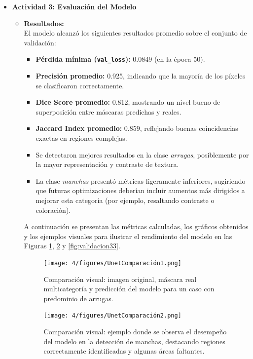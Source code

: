 \begin{enumerate}
\begin{itemize}
  \item\textbf{Actividad 3: Evaluación del Modelo}
  \begin{itemize}
    \item \textbf{Resultados:}\\
El modelo alcanzó los siguientes resultados promedio sobre el conjunto de validación:
\begin{itemize}
  \item \textbf{Pérdida mínima (\texttt{val\_loss}):} 0.0849 (en la época 50).
  \item \textbf{Precisión promedio:} 0.925, indicando que la mayoría de los píxeles se clasificaron correctamente.
  \item \textbf{Dice Score promedio:} 0.812, mostrando un nivel bueno de superposición entre máscaras predichas y reales.
  \item \textbf{Jaccard Index promedio:} 0.859, reflejando buenas coincidencias exactas en regiones complejas.
  \item Se detectaron mejores resultados en la clase \emph{arrugas}, posiblemente por la mayor representación y contraste de textura.
  \item La clase \emph{manchas} presentó métricas ligeramente inferiores, sugiriendo que futuras optimizaciones deberían incluir aumentos más dirigidos a mejorar esta categoría (por ejemplo, resaltando contraste o coloración).
\end{itemize}
  A continuación se presentan las métricas calculadas, los gráficos obtenidos y los ejemplos visuales para ilustrar el rendimiento del modelo en las Figuras \ref{fig:validacion11}, \ref{fig:validacion22} y \ref{fig:validacion33}.

  \vspace{0.2cm}
  \begin{figure}[H]
\centering
\texttt{[image: 4/figures/UnetComparación1.png]}
\caption{Comparación visual: imagen original, máscara real multicategoría y predicción del modelo para un caso con predominio de arrugas.}
\label{fig:validacion11}
\end{figure}

\begin{figure}[H]
\centering
\texttt{[image: 4/figures/UnetComparación2.png]}
\caption{Comparación visual: ejemplo donde se observa el desempeño del modelo en la detección de manchas, destacando regiones correctamente identificadas y algunas áreas faltantes.}
\label{fig:validacion22}
\end{figure}


\end{itemize}
\end{itemize}
\end{enumerate}
